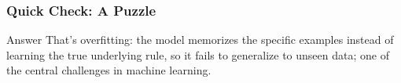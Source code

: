 \begin{frame}[fragile]\frametitle{Quick Check: A Puzzle}
\begin{block}{Answer}
That's overfitting: the model memorizes the specific examples instead of learning the true underlying rule, so it fails to generalize to unseen data; one of the central challenges in machine learning.
\end{block}
\end{frame}

%
%
%
%


